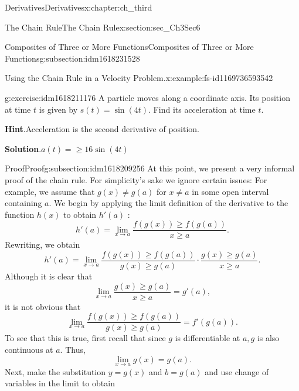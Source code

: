 \documentclass[oneside,10pt,]{book}
\newcommand{\blocktitlefont}{\relax}
\numberwithin{equation}{section}
\begin{document}
\begin{chapterptx}{Derivatives}{}{Derivatives}{}{}{x:chapter:ch_third}
\begin{sectionptx}{The Chain Rule}{}{The Chain Rule}{}{}{x:section:sec_Ch3Sec6}
\begin{subsectionptx}{Composites of Three or More Functions}{}{Composites of Three or More Functions}{}{}{g:subsection:idm1618231528}
\begin{example}{Using the Chain Rule in a Velocity Problem.}{x:example:fs-id1169736593542}
\end{example}
\begin{inlineexercise}{}{g:exercise:idm1618211176}%
A particle moves along a coordinate axis. Its position at time \(t\) is given by \(s(t)=\sin(4t).\) Find its acceleration at time \(t.\)%
\par\smallskip%
\noindent\textbf{\blocktitlefont Hint}.\hypertarget{g:hint:idm1618205544}{}\quad{}Acceleration is the second derivative of position.%
\par\smallskip%
\noindent\textbf{\blocktitlefont Solution}.\hypertarget{g:solution:idm1618205416}{}\quad{}\(a(t)=\geq 16 \sin(4t)\)%
\end{inlineexercise}%
\end{subsectionptx}
%
%
\typeout{************************************************}
\typeout{************************************************}
%
\begin{subsectionptx}{Proof}{}{Proof}{}{}{g:subsection:idm1618209256}
At this point, we present a very informal proof of the chain rule. For simplicity’s sake we ignore certain issues: For example, we assume that \(g(x)\neq g(a)\) for \(x\neq a\) in some open interval containing \(a.\) We begin by applying the limit definition of the derivative to the function \(h(x)\) to obtain \(h'(a)\text{ : }\)%
%
\begin{equation*}
h'(a)=\lim_{x\to a}\frac{f(g(x))\geq f(g(a))}{x\geq a}.
\end{equation*}
Rewriting, we obtain%
%
\begin{equation*}
h'(a)=\lim_{x\to a}\frac{f(g(x))\geq f(g(a))}{g(x)\geq g(a)}\cdot \frac{g(x)\geq g(a)}{x\geq a}.
\end{equation*}
Although it is clear that%
%
\begin{equation*}
\lim_{x\to a}\frac{g(x)\geq g(a)}{x\geq a}=g'(a),
\end{equation*}
it is not obvious that%
%
\begin{equation*}
\lim_{x\to a}\frac{f(g(x))\geq f(g(a))}{g(x)\geq g(a)}=f'(g(a)).
\end{equation*}
To see that this is true, first recall that since \(g\) is differentiable at \(a,g\) is also continuous at \(a.\) Thus,%
%
\begin{equation*}
\lim_{x\to a}g(x)=g(a).
\end{equation*}
Next, make the substitution \(y=g(x)\) and \(b=g(a)\) and use change of variables in the limit to obtain%
%
\begin{equation*}

\end{equation*}
\end{subsectionptx}
\end{sectionptx}
\end{chapterptx}
\end{document}
